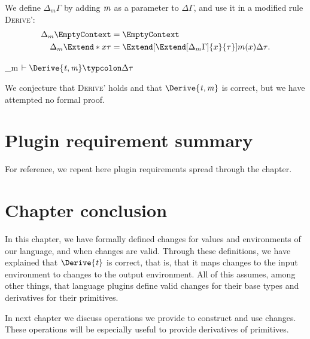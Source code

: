 \begin{itemize}
  We define $\Delta_m \Gamma$ by adding \ensuremath{\Varid{m}} as a parameter to
  \ensuremath{\Delta \Gamma}, and use it in a modified rule \textsc{Derive'}:
\begin{align*}
  \Delta_m\EmptyContext &= \EmptyContext \\
  \Delta_m\Extend*{x}{\tau} &= \Extend[\Extend[\Delta_m\Gamma]{x}{\tau}]{m(x)}{\Delta\tau}\text{.}
\end{align*}
  \begin{typing}
    {\Delta_m \Gamma\ensuremath{\vdash\Derive{\Varid{t},\Varid{m}}\typcolon\Delta \tau}}
  \end{typing}
  We conjecture that \textsc{Derive'} holds and that \ensuremath{\Derive{\Varid{t},\Varid{m}}} is correct,
  but we have attempted no formal proof.
\end{itemize}

\section{Plugin requirement summary}
For reference, we repeat here plugin requirements spread through the chapter.

\baseBasicChangeStructures*
\baseChangeTypes*
\constDifferentiation*
\deriveConstCorrect*

\section{Chapter conclusion}
In this chapter, we have formally defined changes for values and environments of
our language, and when changes are valid. Through these definitions, we have explained
that \ensuremath{\Derive{\Varid{t}}} is correct, that is, that it maps changes to the input
environment to changes to the output environment. All of this assumes, among
other things, that language plugins define valid changes for their base types
and derivatives for their primitives.

In next chapter we discuss operations we provide to construct and use
changes. These operations will be especially useful to provide derivatives of
primitives.
